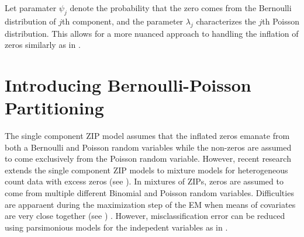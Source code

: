 \documentclass[11pt,letterpaper]{article}
\numberwithin{equation}{section}
\numberwithin{equation}{section}
\numberwithin{equation}{section}
\begin{document}
Let paramater $\psi_j$ denote the probability that the zero comes from the Bernoulli distribution of $j$th component, and the parameter $ \lambda_j $ characterizes the $j$th Poisson distribution. This allows for a more nuanced approach to handling the inflation of zeros similarly as in \cite{Bermudez+Karlis:2012}.  
\section{Introducing Bernoulli-Poisson Partitioning}

The single component ZIP model assumes that the inflated zeros emanate from both a Bernoulli and Poisson random variables while the non-zeros are assumed to come exclusively from the Poisson random variable. However, recent research  extends the single component ZIP models to mixture models for heterogeneous count data with excess zeros (see  \citep{Bermudez+Karlis:2012}). In mixtures of ZIPs, zeros are assumed to come from multiple different Binomial and Poisson random variables.  Difficulties are apparaent  during the maximization step of the EM when means of covariates are very close together (see  \cite{LimHwa}) . However, misclassification error can be reduced using parsimonious models for the indepedent variables as in  \cite{McNicholas:2010}. 
\end{document}

